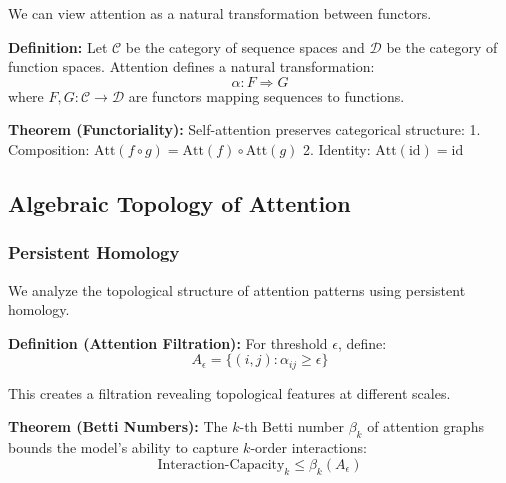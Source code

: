 We can view attention as a natural transformation between functors.

\textbf{Definition:} Let $\mathcal{C}$ be the category of sequence spaces and $\mathcal{D}$ be the category of function spaces. Attention defines a natural transformation:
\begin{equation}
\alpha: F \Rightarrow G
\end{equation}
where $F, G: \mathcal{C} \rightarrow \mathcal{D}$ are functors mapping sequences to functions.

\textbf{Theorem (Functoriality):} Self-attention preserves categorical structure:
1. Composition: $\text{Att}(f \circ g) = \text{Att}(f) \circ \text{Att}(g)$
2. Identity: $\text{Att}(\text{id}) = \text{id}$

\subsection{Algebraic Topology of Attention}

\subsubsection{Persistent Homology}

We analyze the topological structure of attention patterns using persistent homology.

\textbf{Definition (Attention Filtration):} For threshold $\epsilon$, define:
\begin{equation}
A_\epsilon = \{(i,j) : \alpha_{ij} \geq \epsilon\}
\end{equation}

This creates a filtration revealing topological features at different scales.

\textbf{Theorem (Betti Numbers):} The $k$-th Betti number $\beta_k$ of attention graphs bounds the model's ability to capture $k$-order interactions:
\begin{equation}
\text{Interaction-Capacity}_k \leq \beta_k(A_\epsilon)
\end{equation}

